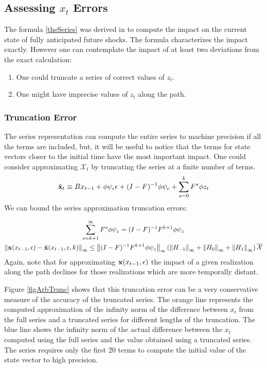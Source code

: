 \documentclass[12pt]{article}
\begin{document}
\subsection{Assessing $x_t$ Errors}
\label{sec:truncationerr}
The formula \ref{theSeries} was derived in \citep{anderson10}
to compute the impact on the current state of fully anticipated future shocks.  The formula characterizes the impact exactly.  However one can contemplate the impact of at least two deviations from the exact calculation:
\begin{enumerate}
\item One could truncate a series of correct values of $z_t$.  
\item One might have imprecise values of $z_t$ along the path.
\end{enumerate}
\subsubsection{Truncation Error}


The series representation can compute the entire series to machine precision
if all the terms are included, but, it will be useful to notice that
the terms for state vectors closer 
to the initial time have the most important impact.
One could consider approximating  $\mathcal{X}_t$ by 
truncating the series  at a finite number of terms.
 	 \begin{gather}
 	 \hat{\mathbf{x}}_t \equiv B x_{t-1}+ \phi \psi_\epsilon\epsilon  + (I - F)^{-1} \phi \psi_c + \sum_{s=0}^k F^s \phi z_{t}\label{theTruncSeries}
 \end{gather}
We can bound the  series approximation truncation errors:

    \begin{gather}
      \label{eq:1}
\sum_{s=k+1}^{\infty} F^s \phi \psi_z = (I -F)^{-1} F^{k+1}\phi \psi_z       \\
\left\lVert\mathbf{x}(x_{t-1},\epsilon)-\hat{\mathbf{x}}(x_{t-1},\epsilon,k)\right\rVert_\infty \le \left\lVert(I -F)^{-1} F^{k+1}\phi \psi_z\right\rVert_\infty \left ( \left\lVert H_{-1} \right\rVert_\infty+ \left\lVert H_{0} \right\rVert_\infty+ \left\lVert H_{1} \right\rVert_\infty \right )\overline{\mathcal{X}}
    \end{gather}
Again, note that for approximating $\mathbf{x}(x_{t-1},\epsilon)$ the impact of  a given realization along the path declines for those realizations which are  more temporally distant.

 Figure \ref{figArbTrunc} shows
that this truncation error can be  a very conservative measure of the accuracy
of the truncated series.  The orange line represents the computed approximation of
the infinity norm of the difference between $x_t$ from the full series and a truncated series for different lengths of the truncation.  The blue line shows the infinity norm of the actual difference between the $x_t$ computed using the full series and the value obtained using a truncated series.  The series requires only the first 20 terms to compute
the initial value of the state vector to high precision. 
\end{document}
